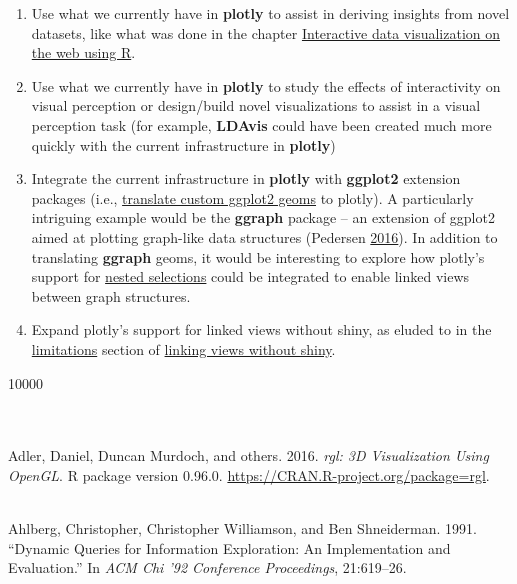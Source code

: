 \documentclass[12pt,]{isuthesis}
\begin{document}
\begin{enumerate}
\def\labelenumi{\arabic{enumi}.}
\item
  Use what we currently have in \textbf{plotly} to assist in deriving
  insights from novel datasets, like what was done in the chapter
  \protect\hyperlink{interactive-data-visualization-on-the-web-using-R}{Interactive
  data visualization on the web using R}.
\item
  Use what we currently have in \textbf{plotly} to study the effects of
  interactivity on visual perception or design/build novel
  visualizations to assist in a visual perception task (for example,
  \textbf{LDAvis} could have been created much more quickly with the
  current infrastructure in \textbf{plotly})
\item
  Integrate the current infrastructure in \textbf{plotly} with
  \textbf{ggplot2} extension packages (i.e.,
  \protect\hyperlink{translating-custom-ggplot2-geoms}{translate custom
  ggplot2 geoms} to plotly). A particularly intriguing example would be
  the \textbf{ggraph} package -- an extension of ggplot2 aimed at
  plotting graph-like data structures (Pedersen
  \protect\hyperlink{ref-ggraph}{2016}). In addition to translating
  \textbf{ggraph} geoms, it would be interesting to explore how plotly's
  support for \protect\hyperlink{nested-selections}{nested selections}
  could be integrated to enable linked views between graph structures.
\item
  Expand plotly's support for linked views without shiny, as eluded to
  in the \protect\hyperlink{limitations}{limitations} section of
  \protect\hyperlink{linking-views-without-shiny}{linking views without
  shiny}.
\end{enumerate}

\newcommand{\tex}[1]{#1}

\tex{
  \renewcommand{\baselinestretch}{0.55}\normalsize
  \let\oldhypertarget\hypertarget
  \renewcommand{\hypertarget}[2]{\oldhypertarget{#1}{#2}~\\[0in]\indent}
  \specialchapt{BIBLIOGRAPHY}
  \vspace{-1cm}
  \widowpenalties 1 10000
  \raggedbottom
}

\hypertarget{refs}{}
\hypertarget{ref-rgl}{}
Adler, Daniel, Duncan Murdoch, and others. 2016. \emph{rgl: 3D
Visualization Using OpenGL}. R package version 0.96.0.
\url{https://CRAN.R-project.org/package=rgl}.

\hypertarget{ref-Ahlberg:1991}{}
Ahlberg, Christopher, Christopher Williamson, and Ben Shneiderman. 1991.
``Dynamic Queries for Information Exploration: An Implementation and
Evaluation.'' In \emph{ACM Chi '92 Conference Proceedings}, 21:619--26.
\end{document}
